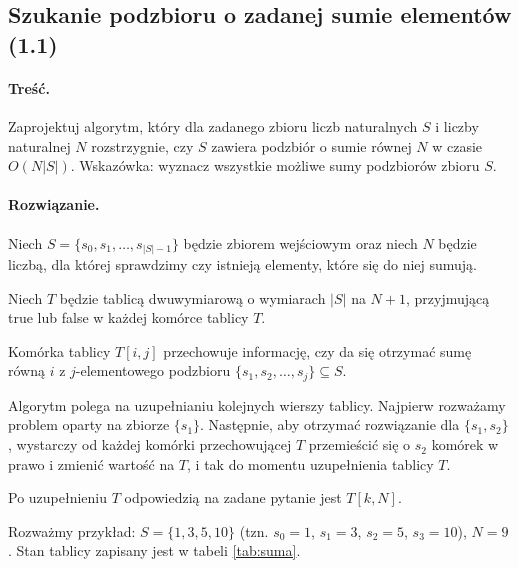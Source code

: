 \subsection{Szukanie podzbioru o zadanej sumie elementów (1.1)}

\paragraph{Treść.} Zaprojektuj algorytm, który dla zadanego zbioru 
liczb naturalnych $S$ i liczby naturalnej $N$ rozstrzygnie,
czy $S$ zawiera podzbiór o sumie równej $N$ w czasie $O(N |S|)$.
Wskazówka: wyznacz wszystkie możliwe sumy podzbiorów zbioru $S$.
\paragraph{Rozwiązanie.} Niech $S = \{s_0, s_1, \dots, s_{|S| - 1}\}$ będzie zbiorem wejściowym oraz 
niech $N$ będzie liczbą, dla której sprawdzimy czy istnieją elementy, które się do niej sumują.

Niech $T$ będzie tablicą dwuwymiarową o wymiarach $|S|$ na $N + 1$, przyjmującą
\textsf{true} lub \textsf{false} w każdej komórce tablicy $T$.

Komórka tablicy $T[i, j]$ przechowuje informację, czy da się otrzymać 
sumę równą $i$ z $j$-elementowego podzbioru $\{s_1, s_2, \dots, s_j\} \subseteq S$.

Algorytm polega na uzupełnianiu kolejnych wierszy tablicy.
Najpierw rozważamy problem oparty na zbiorze $\{s_1\}$. 
Następnie, aby otrzymać rozwiązanie dla $\{s_1, s_2\}$, wystarczy
od każdej komórki przechowującej $T$ przemieścić się o $s_2$ komórek w prawo
i zmienić wartość na $T$, i tak do momentu uzupełnienia tablicy $T$.

Po uzupełnieniu $T$ odpowiedzią na zadane pytanie jest $T[k, N]$.

Rozważmy przykład: $S = \{1, 3, 5, 10\}$ (tzn. $s_0=1$, $s_1=3$, $s_2=5$, $s_3=10$), 
$N = 9$. Stan tablicy zapisany jest w tabeli \ref{tab:suma}.


